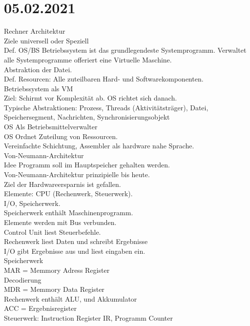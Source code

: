 \documentclass{article}
\begin{document}
	\section*{05.02.2021}
	Rechner Architektur \\
	Ziele universell oder Speziell \\
	Def. OS/BS Betriebssystem ist das grundlegendeste Systemprogramm. Verwaltet alle Systemprogramme offeriert eine Virtuelle Maschine. \\
	Abstraktion der Datei. \\
	Def. Resourcen: Alle zuteilbaren Hard- und Softwarekomponenten. \\
	Betriebssystem als VM \\
	Ziel: Schirmt vor Komplexität ab. OS richtet sich danach. \\
	Typische Abstraktionen: Prozess, Threads (Aktivitätsträger), Datei, Speichersegment, Nachrichten, Synchronisierungsobjekt \\
	OS Als Betriebsmittelverwalter \\
	OS Ordnet Zuteilung von Ressourcen. \\
	Vereinfachte Schichtung, Assembler als hardware nahe Sprache. \\
	Von-Neumann-Architektur \\
	Idee Programm soll im Hauptspeicher gehalten werden. \\
	Von-Neumann-Architektur prinzipielle bis heute. \\
	Ziel der Hardwareersparnis ist gefallen. \\
	Elemente: CPU (Rechenwerk, Steuerwerk). \\
	I/O, Speicherwerk. \\
	Speicherwerk enthält Maschinenprogramm. \\
	Elemente werden mit Bus verbunden. \\
	Control Unit liest Steuerbefehle. \\
	Rechenwerk liest Daten und schreibt Ergebnisse \\
	I/O gibt Ergebnisse aus und liest eingaben ein. \\
	Speicherwerk \\
	MAR = Memmory Adress Register \\
	Decodierung \\
	MDR = Memmory Data Register \\
	Rechenwerk enthält ALU, und Akkumulator \\
	ACC = Ergebnisregister \\
	Steuerwerk: Instruction Register IR, Programm Counter \\
\end{document}
